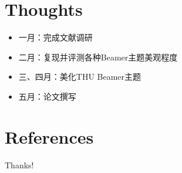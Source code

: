 \documentclass{beamer}
\begin{document}
\section{Thoughts}

\begin{frame}
    \begin{itemize}
        \item 一月：完成文献调研
        \item 二月：复现并评测各种Beamer主题美观程度
        \item 三、四月：美化THU Beamer主题
        \item 五月：论文撰写
    \end{itemize}
\end{frame}

\section{References}

\begin{frame}[allowframebreaks]
    \nocite{*} %
    
    
\end{frame}

\begin{frame}
    \begin{center}
        {\Huge\calligra Thanks!}
    \end{center}
\end{frame}
\end{document}

